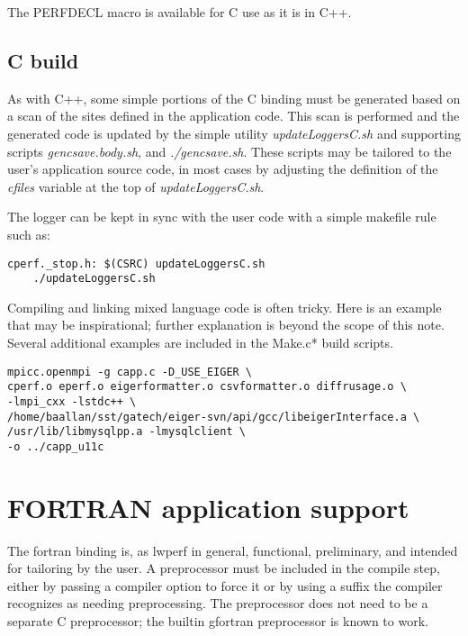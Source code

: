 \documentclass{article}
\begin{document}
The PERFDECL macro is available for C use as it is in C++.

\subsection{C build}
\label{sec:cbuild}
As with C++, some simple portions of the C binding must be generated based on a scan of the sites defined in the application code. This scan is performed and the generated code is updated by the simple utility {\em updateLoggersC.sh} and supporting scripts {\em gencsave.body.sh}, and {\em ./gencsave.sh}. These scripts may be tailored to the user's application source code, in most cases by adjusting the definition of the {\em cfiles} variable at the top of {\em updateLoggersC.sh}.

The logger can be kept in sync with the user code with a simple makefile rule such as:
\begin{verbatim}
cperf._stop.h: $(CSRC) updateLoggersC.sh
	./updateLoggersC.sh
\end{verbatim}

Compiling and linking mixed language code is often tricky. Here is an example that may be inspirational; further explanation is beyond the scope of this note. Several additional examples are included in the Make.c* build scripts.
\begin{verbatim}
mpicc.openmpi -g capp.c -D_USE_EIGER \
cperf.o eperf.o eigerformatter.o csvformatter.o diffrusage.o \
-lmpi_cxx -lstdc++ \
/home/baallan/sst/gatech/eiger-svn/api/gcc/libeigerInterface.a \
/usr/lib/libmysqlpp.a -lmysqlclient \
-o ../capp_u11c
\end{verbatim}

\section{FORTRAN application support}
\label{sec:fortran}
The fortran binding is, as lwperf in general, functional, preliminary, and intended for tailoring by the user.  A preprocessor must be included in the compile step, either by passing a compiler option to force it or by using a suffix the compiler recognizes as needing preprocessing. The preprocessor does not need to be a separate C preprocessor; the builtin gfortran preprocessor is known to work.
\end{document}
